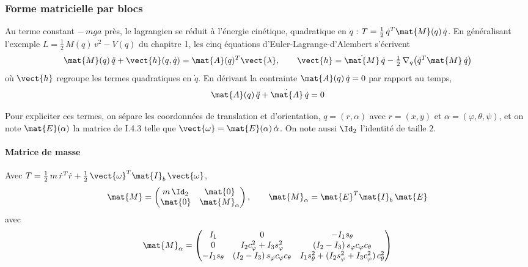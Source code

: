 
\subsubsection{Forme matricielle par blocs}

Au terme constant $-\,m g a$ près, le lagrangien se réduit à l'énergie
cinétique, quadratique en $\dot q$ :
$T = \tfrac12\,\dot q^T\mat{M}(q)\,\dot q$. En généralisant l'exemple
$L = \tfrac12\,M(q)\,v^2 - V(q)$ du chapitre 1, les cinq équations
d'Euler-Lagrange-d'Alembert s'écrivent
\[
    \mat{M}(q)\,\ddot q + \vect{h}(q,\dot q) = \mat{A}(q)^T\vect{\lambda},
    \qquad
    \vect{h} = \dot{\mat{M}}\,\dot q
    - \tfrac12\,\nabla_q\bigl(\dot q^T\mat{M}\,\dot q\bigr)
\]
où $\vect{h}$ regroupe les termes quadratiques en $\dot q$. En dérivant
la contrainte $\mat{A}(q)\,\dot q = 0$ par rapport au temps,
\[
    \mat{A}(q)\,\ddot q + \dot{\mat{A}}\,\dot q = 0
\]

Pour expliciter ces termes, on sépare les coordonnées de translation
et d'orientation, $q = (r,\alpha)$ avec $r = (x,y)$ et
$\alpha = (\varphi,\theta,\psi)$, et on note $\mat{E}(\alpha)$ la
matrice de I.4.3 telle que $\vect{\omega} = \mat{E}(\alpha)\,\dot\alpha$.
On note aussi $\Id_2$ l'identité de taille $2$.

\paragraph{Matrice de masse}
Avec $T = \tfrac12\,m\,\dot r^T\dot r
+ \tfrac12\,\vect{\omega}^T\mat{I}_b\,\vect{\omega}$,
\[
    \mat{M} = \begin{pmatrix}
        m\,\Id_2 & \mat{0}\\
        \mat{0} & \mat{M}_\alpha
    \end{pmatrix},
    \qquad
    \mat{M}_\alpha = \mat{E}^T\mat{I}_b\,\mat{E}
\]
avec
\[
    \mat{M}_\alpha = \begin{pmatrix}
        I_1 & 0 & -I_1 s_\theta\\
        0 & I_2 c_\varphi^2 + I_3 s_\varphi^2
            & (I_2 - I_3)\,s_\varphi c_\varphi c_\theta\\
        -I_1 s_\theta & (I_2 - I_3)\,s_\varphi c_\varphi c_\theta
            & I_1 s_\theta^2 + (I_2 s_\varphi^2 + I_3 c_\varphi^2)\,
            c_\theta^2
    \end{pmatrix}
\]

